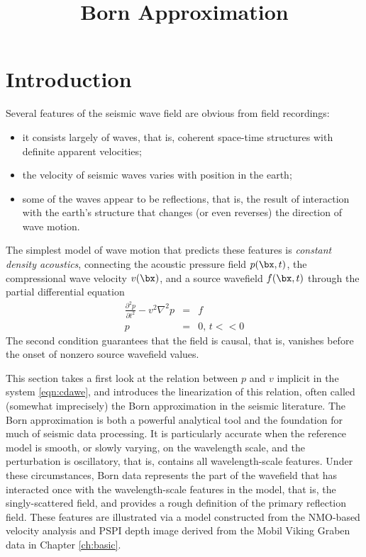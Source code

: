 \title{Born Approximation}
\maketitle
\label{ch:born}


\section{Introduction}
Several features of the seismic wave field are obvious from field recordings:
\begin{itemize}
\item it consists largely of waves, that is, coherent space-time structures with definite apparent velocities;
\item the velocity of seismic waves varies with position in the earth;
\item some of the waves appear to be reflections, that is, the result of interaction with the earth's structure that changes (or even reverses) the direction of wave motion.
\end{itemize}
The simplest model of wave motion that predicts these features is {\em constant density acoustics},  connecting the acoustic pressure field $p(\bx,t)$, the compressional wave velocity $v(\bx)$, and a source wavefield $f(\bx,t)$ through the partial differential equation
\begin{eqnarray}
\label{eqn:cdawe}
\frac{\partial^2 p}{\partial t^2} -v^2 \nabla^2 p& = & f\\
p &= & 0, \,t<<0 \nonumber 
\end{eqnarray} 
The second condition guarantees that the field is causal, that is, vanishes before the onset of nonzero source wavefield values.

This section takes a first look at the relation between $p$ and $v$ implicit in the system \ref{eqn:cdawe}, and introduces the linearization of this relation, often called (somewhat imprecisely) the Born approximation in the seismic literature. The Born approximation is both a powerful analytical tool and the foundation for much of seismic data processing. It is particularly accurate when the reference model is smooth, or slowly varying, on the wavelength scale, and the perturbation is oscillatory, that is, contains all wavelength-scale features. Under these circumstances, Born data represents the part of the wavefield that has interacted once with the wavelength-scale features in the model, that is, the singly-scattered field, and provides a rough definition of the primary reflection field. These features are illustrated via a model constructed from the NMO-based velocity analysis and PSPI depth image derived from the Mobil Viking Graben data in Chapter \ref{ch:basic}.%

